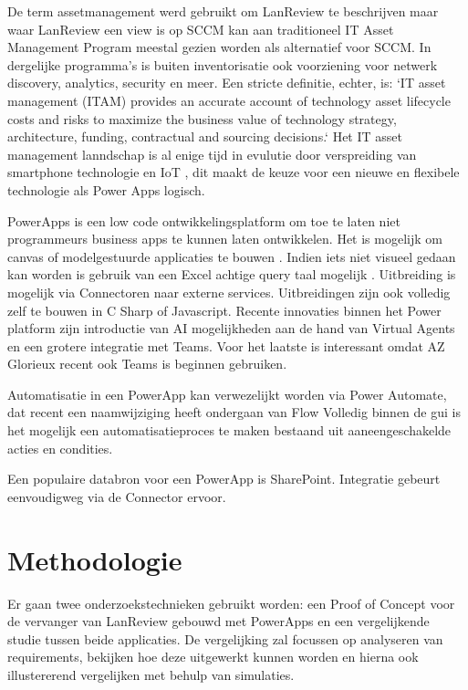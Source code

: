 De term assetmanagement werd gebruikt om LanReview te beschrijven maar waar LanReview een view is op SCCM kan aan traditioneel IT Asset Management Program meestal gezien worden als alternatief voor SCCM. In dergelijke programma's is buiten inventorisatie ook voorziening voor netwerk discovery, analytics, security en meer. Een stricte definitie, echter, is: `IT asset management (ITAM) provides an accurate account of technology asset lifecycle costs and risks to maximize the business value of technology strategy, architecture, funding, contractual and sourcing decisions.` \parencite{Gartner2020}
Het IT asset management lanndschap is al enige tijd in evulutie door verspreiding van smartphone technologie en  IoT \parencite{Badnakhe2020}, dit maakt de keuze voor een nieuwe en flexibele technologie als Power Apps logisch.

PowerApps is een low code ontwikkelingsplatform om toe te laten niet programmeurs business apps te kunnen laten ontwikkelen. Het is mogelijk om canvas of modelgestuurde applicaties te bouwen \parencite{Knight2019}. Indien iets niet visueel gedaan kan worden is gebruik van een Excel achtige query taal mogelijk \parencite{Owen2019}. Uitbreiding is mogelijk via Connectoren naar externe services. Uitbreidingen zijn ook volledig zelf te bouwen in C Sharp \parencite{Vivek2019} of Javascript.
Recente innovaties binnen het Power platform zijn introductie van AI mogelijkheden aan de hand van Virtual Agents en een grotere integratie met Teams. \parencite{Cunningham2019} Voor het laatste is interessant omdat AZ Glorieux recent ook Teams is beginnen gebruiken.

Automatisatie in een PowerApp kan verwezelijkt worden via Power Automate, dat recent een naamwijziging heeft ondergaan van Flow \parencite{Weare2019} Volledig binnen de gui is het mogelijk een automatisatieproces te maken bestaand uit aaneengeschakelde acties en condities.

Een populaire databron voor een PowerApp is SharePoint. Integratie gebeurt eenvoudigweg via de Connector ervoor. \parencite{Owen2019a}


\section{Methodologie}
\label{sec:methodologie}

Er gaan twee onderzoekstechnieken gebruikt worden: een Proof of Concept voor de vervanger van LanReview gebouwd met PowerApps en een vergelijkende studie tussen beide applicaties. De vergelijking zal focussen op analyseren van requirements, bekijken hoe deze uitgewerkt kunnen worden en hierna ook illustererend vergelijken met behulp van simulaties.

